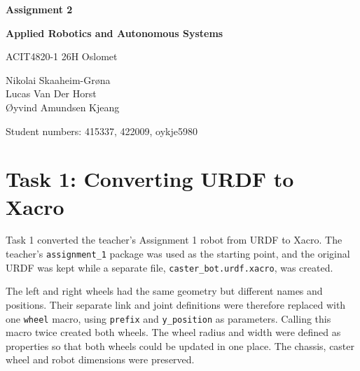 \documentclass[10pt,a4paper]{article}
\begin{document}
\begin{center}
    {\LARGE \textbf{Assignment 2}}\\

    \vspace{0.15cm}

    {\Large \textbf{Applied Robotics and Autonomous Systems}}

    \vspace{0.3cm}

    ACIT4820-1 26H Oslomet

    \vspace{0.3cm}

    Nikolai Skaaheim-Grøna \\
    Lucas Van Der Horst \\
    Øyvind Amundsen Kjeang

    \vspace{0.3cm}

    Student numbers: 415337, 422009, oykje5980
\end{center}

\vspace{0.4cm}

\tableofcontents

\vspace{0.5cm}


\section{Task 1: Converting URDF to Xacro}

Task 1 converted the teacher's Assignment 1 robot from URDF to Xacro. The teacher's \texttt{assignment\_1} package was used as the starting point, and the original URDF was kept while a separate file, \texttt{caster\_bot.urdf.xacro}, was created.

The left and right wheels had the same geometry but different names and positions. Their separate link and joint definitions were therefore replaced with one \texttt{wheel} macro, using \texttt{prefix} and \texttt{y\_position} as parameters. Calling this macro twice created both wheels. The wheel radius and width were defined as properties so that both wheels could be updated in one place. The chassis, caster wheel and robot dimensions were preserved.
\end{document}
